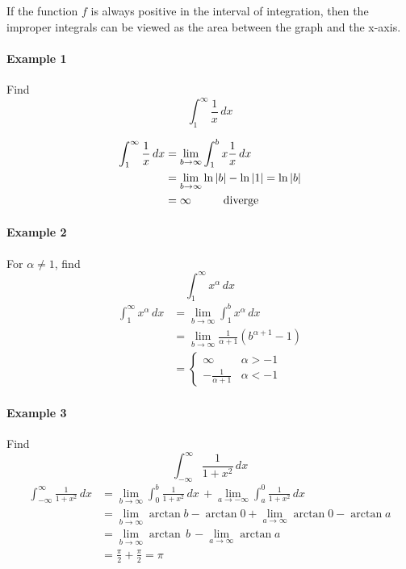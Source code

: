 \documentclass[12pt]{article}
\newcommand\tab[1][1cm]{\hspace*{#1}}
\begin{document}
\noindent
If the function $f$ is always positive in the interval of integration, then the improper integrals can be viewed as the area between the graph and the x-axis.

\paragraph{Example 1} Find 
\[
    \int_1^{\infty} \frac{1}{x} \, dx
\] 

\begin{align*} 
    \int_1^{\infty} \frac{1}{x} \, dx &= \lim_{b \to \infty} \int_1^b x\frac{1}{x} \, dx \\
    &= \lim_{b \to \infty} \ln |b| - \ln |1| = \ln |b| \\
    &= \infty \textrm{\tab diverge}
\end{align*}
\paragraph{Example 2} For $\alpha \neq 1$, find 
\[
    \int_1^{\infty} x^{\alpha} \, dx
\]
\begin{align*} 
    \int_1^{\infty} x^{\alpha} \, dx &= \lim_{b \to \infty} \int_1^{b} x^{\alpha} \, dx \\
    &= \lim_{b \to \infty} \frac{1}{\alpha + 1} (b^{\alpha + 1} - 1) \\
    &= \begin{cases} 
        \infty & \alpha > - 1 \\
        - \frac{1}{\alpha + 1} & \alpha < - 1
    \end{cases} 
\end{align*}
\paragraph{Example 3} Find
\[
    \int_{ -\infty}^{\infty} \frac{1}{1 + x^2} \, dx
\]
\begin{align*} 
    \int_{ -\infty}^{\infty} \frac{1}{1 + x^2} \, dx &= \lim_{b \to \infty} \int_{0}^{b} \frac{1}{1 + x^2} \, dx\, + \lim_{a \to - \infty} \int_{a}^{0} \frac{1}{1 + x^2} \, dx \\
    &= \lim_{b \to \infty} \arctan b - \arctan 0 + \lim_{a \to \infty} \arctan 0 - \arctan a \\
    &= \lim_{b \to \infty} \arctan\, b\, - \lim_{a \to \infty} \arctan  a \\
    &= \frac{\pi}{2} + \frac{\pi}{2} = \pi
\end{align*}
\end{document}

